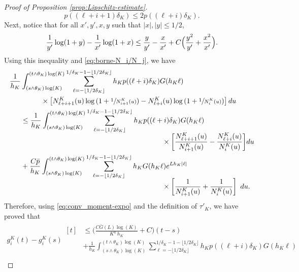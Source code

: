 \documentclass[10pt]{amsart}
\theoremstyle{plain}
\theoremstyle{remark}
\begin{document}
\begin{proof}[Proof of Proposition \ref{prop:Lipschitz-estimate}]
\[
p((\ell+i+1)\delta_K)\leq 2p((\ell+i)\delta_K).
\]
Next, notice that for all {$x',y',x,y$ such that $|x|,|y|\leq 1/2$,\vspace*{-3pt}
\begin{equation*}%
{1 \over y'}\log(1+{ y}) -{ 1\over x'}\log(1+{ x}) \le {y\over y'} - {x\over x'} + C\Big({y^2\over y'}+{x^2\over x'}\Big).
\end{equation*}
Using this inequality and \eqref{eq:borne-N_i/N_j}, we have\vspace*{-3pt}
\begin{align*}
\frac{1}{h_K} & \int_{(s\wedge\theta_K)\log(K)}^{(t\wedge\theta_K)\log(K)} \sum_{\ell=-\lfloor 1/2\delta_K\rfloor}^{1/\delta_K-1-\lfloor 1/2\delta_K\rfloor} h_{K} p((\ell+i)\delta_K) G(h_{K}\ell)\\
& \hspace{1cm} \times \left[N_{\ell+i+1}^K(u)\log \left(1+\sfrac{1}{N_{i+1}^K(u)}\right)-N_{\ell+i}^K(u)\log \left(1+\sfrac{1}{N_{i}^K(u)}\right)
\right]du \\
& \leq \frac{1}{h_K}\int_{(s\wedge\theta_K)\log(K)}^{(t\wedge\theta_K)\log(K)} \sum_{\ell=-\lfloor 1/2\delta_K\rfloor}^{1/\delta_K-1-\lfloor 1/2\delta_K\rfloor} h_Kp((\ell+i)\delta_K)G(h_K\ell)\\[-5pt]
& \hspace{7cm} \times \biggl[\frac{N_{\ell+i+1}^K(u)}{N_{i+1}^K(u)}-\frac{N_{\ell+i}^K(u)}{N_{i}^K(u)}
\biggr]du \\
& +\frac{C\bar p}{h_K}\int_{(s\wedge\theta_K)\log(K)}^{(t\wedge\theta_K)\log(K)} \sum_{\ell=-\lfloor 1/2\delta_K\rfloor}^{1/\delta_K-1-\lfloor 1/2\delta_K\rfloor} h_KG(h_K\ell)e^{Lh_K|\ell|}\\[-5pt]
& \hspace{7cm} \times \left[\frac{1}{N_{i+1}^K(u)}+\frac{1}{N_{i}^K(u)}\right]\ du.
\end{align*}
Therefore, using \eqref{eq:conv_moment-expo} and the definition of $\tau'_K$, we have proved that\vspace*{-.5\baselineskip}\enlargethispage{\baselineskip}
\begin{multline*}
g^K_{i}(t) - g^K_{i}(s)
\begin{aligned}[t]
& \leq \biggl(\frac{C\bar G(L)\log(K)}{ K^a \ h_K}+C\biggr)(t-s) \\
& +\frac{1}{h_K}\int_{(s\wedge\theta_K)\log(K)}^{(t\wedge\theta_K)\log(K)} \sum_{\ell=-\lfloor 1/2\delta_K\rfloor}^{1/\delta_K-1-\lfloor 1/2\delta_K\rfloor} h_Kp((\ell+i)\delta_K)G(h_K\ell)\\

\end{aligned}
\end{multline*}}
\end{proof}
\end{document}
